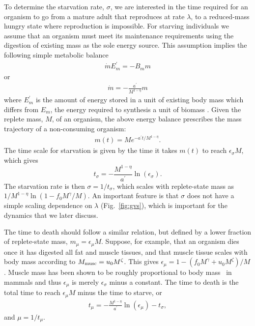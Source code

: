 \documentclass[twocolumn,preprintnumbers,amsmath,amssymb,superscriptaddress]{revtex4}
\begin{document}
To determine the starvation rate, $\sigma$, we are interested in the time
required for an organism to go from a mature adult that reproduces at rate
$\lambda$, to a
reduced-mass hungry state where reproduction is impossible.  For starving individuals we assume that an organism must meet its maintenance requirements using the digestion of existing mass as the sole energy source.
This assumption implies the following simple metabolic balance 
\begin{eqnarray}
\dot{m}E_{m}^{\prime}=-B_{m}m
\end{eqnarray}
or
\begin{eqnarray}
\dot{m}=-\frac{a^{\prime}}{M^{1-\eta}}m
\end{eqnarray}
where $E_{m}^{\prime}$ is the amount of energy stored in a unit of existing
body mass which differs from $E_{m}$, the energy required to
synthesis a unit of biomass \cite{hou}. Given the replete mass, $M$, of an organism, the
above energy balance prescribes the mass trajectory of a non-consuming
organism:
\begin{eqnarray}
\label{mt}
m\left(t\right)=Me^{-a^{\prime}t/M^{1-\eta}}.
\end{eqnarray}
The time scale for starvation is
given by the time it takes $m(t)$ to reach $\epsilon_{\sigma} M$, which gives
\begin{equation}
\label{eq:sigma}
t_{\sigma}=-\frac{M^{1-\eta}}{a^{\prime}}\ln\left(\epsilon_{\sigma}\right).
\end{equation}
The starvation rate is then $\sigma=1/t_{\sigma}$, which scales with
replete-state mass as $1/M^{1-\eta}\ln\left(1-f_{0}M^{\gamma}/M\right)$.  An important
feature is that $\sigma$ does not have a simple scaling dependence on
$\lambda$ (Fig.~\ref{fig:gvs}), which is important for the dynamics that we
later discuss.

The time to death should follow a similar relation, but defined by a lower
fraction of replete-state mass, $m_{\mu}=\epsilon_{\mu} M$.
Suppose, for example, that an organism dies once it has digested all fat and
muscle tissues, and that muscle tissue scales with body mass according to
$M_{\rm musc}=u_{0}M^{\zeta}$.  This gives
$\epsilon_{\mu}=1-\left(f_{0}M^{\gamma}+u_{0}M^{\zeta}\right)/M$. Muscle
mass has been shown to be roughly proportional to body mass~\cite{Folland:2008ij} in
mammals and thus $\epsilon_{\mu}$ is merely $\epsilon_{\sigma}$ minus a constant. The time to death is the total time to reach $\epsilon_{\mu}M$ minus the time to starve, or
\begin{eqnarray}
t_{\mu}=-\frac{M^{1-\eta}}{a^{\prime}}\ln\left(\epsilon_{\mu}\right)-t_{\sigma},
\end{eqnarray}
and $\mu=1/t_{\mu}$. 
\end{document}
